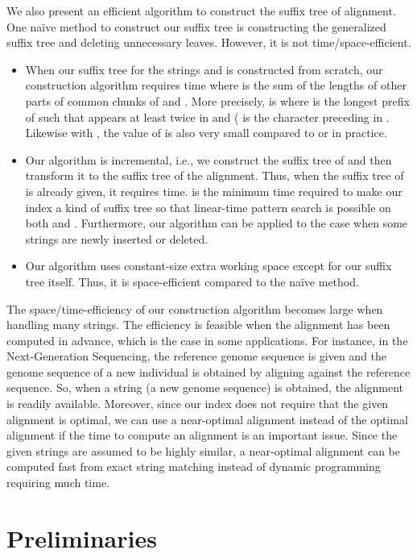\documentclass{llncs}
\newcommand{\bi}{\begin{itemize}}
\newcommand{\ei}{\end{itemize}}
\begin{document}
We also present an efficient algorithm to construct the suffix tree of alignment.
One na\"{i}ve method to construct our suffix tree is constructing the generalized suffix tree
 and deleting unnecessary leaves.
However, it is not time/space-efficient.
\bi
\item When our suffix tree for the strings  and  is constructed from scratch,
  our construction algorithm requires  time
  where  is the sum of the lengths of other parts of common chunks of  and .
 More precisely,  is 
  where  is the longest prefix of 
  such that  appears at least twice in  and 
  ( is the character preceding  in .
Likewise with ,
 the value of  is also very small compared to  or  in practice.
\item Our algorithm is incremental,
    i.e., we construct the suffix tree of 
     and then transform it to the suffix tree of the alignment.
    Thus, when the suffix tree of  is already given,
     it requires  time.
     is the minimum time required to make our index a kind of suffix tree
     so that linear-time pattern search is possible on both  and .
    Furthermore, our algorithm can be applied to the case when some strings are newly inserted
     or deleted.
\item Our algorithm uses constant-size extra working space except for our suffix tree itself.
 Thus, it is space-efficient compared to the na\"{i}ve method.
\ei
The space/time-efficiency of our construction algorithm becomes large
 when handling many strings.
The efficiency is feasible when the alignment has been computed in advance,
 which is the case in some applications.
For instance, in the Next-Generation Sequencing,
 the reference genome sequence is given
 and the genome sequence of a new individual is obtained
 by aligning against the reference sequence.
So, when a string (a new genome sequence) is obtained,
 the alignment is readily available.
Moreover, since our index does not require that the given alignment is optimal,
 we can use a near-optimal alignment instead of the optimal alignment
 if the time to compute an alignment is an important issue.
Since the given strings are assumed to be highly similar,
 a near-optimal alignment can be computed fast from exact string matching
 instead of dynamic programming requiring much time.




\section{Preliminaries}
\label{sec:preliminaries}
\end{document}
